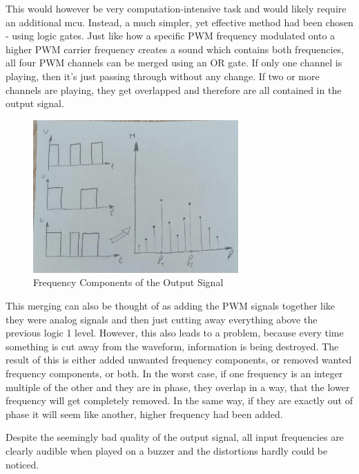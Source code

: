 This would however be very computation-intensive task and would likely require an additional \gls{mcu}. Instead, a much simpler, yet effective method had been chosen - using logic gates. Just like how a specific PWM frequency modulated onto a higher PWM carrier frequency creates a sound which contains both frequencies, all four PWM channels can be merged using an OR gate. If only one channel is playing, then it's just passing through without any change. If two or more channels are playing, they get overlapped and therefore are all contained in the output signal. 

\begin{figure}[h!]
    \centering
    \includegraphics[width=0.7\textwidth]{felix/resources/signalCombinationFourier.jpg}
    \caption{Frequency Components of the Output Signal}
    \label{fig:signal-combination-fourier}
\end{figure}

This merging can also be thought of as adding the PWM signals together like they were analog signals and then just cutting away everything above the previous logic 1 level. However, this also leads to a problem, because every time something is cut away from the waveform, information is being destroyed. The result of this is either added unwanted frequency components, or removed wanted frequency components, or both. In the worst case, if one frequency is an integer multiple of the other and they are in phase, they overlap in a way, that the lower frequency will get completely removed. In the same way, if they are exactly out of phase it will seem like another, higher frequency had been added.


Despite the seemingly bad quality of the output signal, all input frequencies are clearly audible when played on a buzzer and the distortions hardly could be noticed.